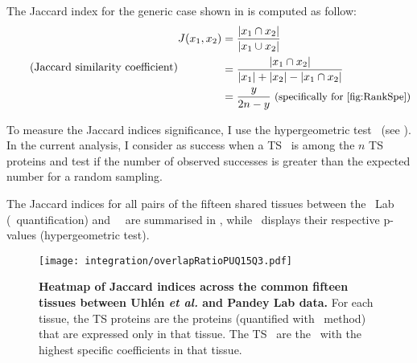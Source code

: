 \begin{minipage}{\textwidth}
    The Jaccard index for the generic case shown in 
    is computed as follow:
\begin{equation}
    \tag{Jaccard similarity coefficient}\label{eq:Jaccard}
    \begin{split}
        J(x_{1},x_{2}) & = \frac{\left | x_{1}\cap  x_{2}\right |}%
                                {\left | x_{1}\cup  x_{2}\right |}\\
                       & = \frac{\left | x_{1}\cap  x_{2}\right |}%
                                {\left | x_{1} \right | + \left | x_{2} \right |%
                                - \left | x_{1}\cap  x_{2}\right |}\\
                                & = \frac{y}{2n-y} \text{\small{~(specifically
                                for~\Cref{fig:RankSpe})}}\\
    \end{split}
    \raisetag{6cm}
\end{equation}
\end{minipage}

To measure the Jaccard indices significance,
I use the hypergeometric test~
(see ).
In the current analysis,
I consider as success when a \gls{TS} \mRNA\ is among the $n$ \gls{TS} proteins
and test if the number of observed successes is greater than
the expected number for a random sampling.

\vspace{-2mm}
The Jaccard indices for all pairs of the fifteen shared tissues
between the \pandey\ Lab (\PPKM\ quantification) and \uhlen\ \etal\
are summarised in ,
while~ displays
their respective p-values (hypergeometric test).\mybr\

\begin{figure}[!ht]
    \texttt{[image: integration/overlapRatioPUQ15Q3.pdf]}\centering
    \vspace{-3mm}
    \caption[Heatmap of Jaccard indices across 15 tissues]{%
\label{fig:JaccardIndexes}\label{fig:RatioJac}\textbf{Heatmap of Jaccard indices
across the common fifteen tissues between Uhlén \textit{et al.} and Pandey Lab data.}
For each tissue, the \gls{TS} proteins are the proteins
(quantified with \PPKM\ method) that are expressed only in that tissue.
The \gls{TS} \mRNAs\ are the \mRNAs\ with the highest specific coefficients
in that tissue.}
\end{figure}

